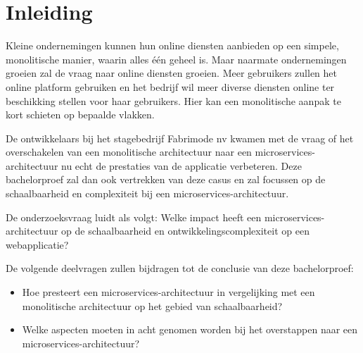 


% 

\section{Inleiding}%
\label{sec:inleiding}

Kleine ondernemingen kunnen hun online diensten aanbieden op een simpele, monolitische manier, waarin alles één geheel is. Maar naarmate ondernemingen groeien zal de vraag naar online diensten groeien. Meer gebruikers zullen het online platform gebruiken en het bedrijf wil meer diverse diensten online ter beschikking stellen voor haar gebruikers. Hier kan een monolitische aanpak te kort schieten op bepaalde vlakken.

De ontwikkelaars bij het stagebedrijf Fabrimode nv kwamen met de vraag of het overschakelen van een monolitische architectuur naar een microservices-architectuur nu echt de prestaties van de applicatie verbeteren. Deze bachelorproef zal dan ook vertrekken van deze casus en zal focussen op de schaalbaarheid en complexiteit bij een microservices-architectuur.

De onderzoeksvraag luidt als volgt: Welke impact heeft een microservices-architectuur op de schaalbaarheid en ontwikkelingscomplexiteit op een webapplicatie?

De volgende deelvragen zullen bijdragen tot de conclusie van deze bachelorproef:
\begin{itemize}
	\item Hoe presteert een microservices-architectuur in vergelijking met een monolitische architectuur op het gebied van schaalbaarheid?
	\item Welke aspecten moeten in acht genomen worden bij het overstappen naar een microservices-architectuur?
\end{itemize}

